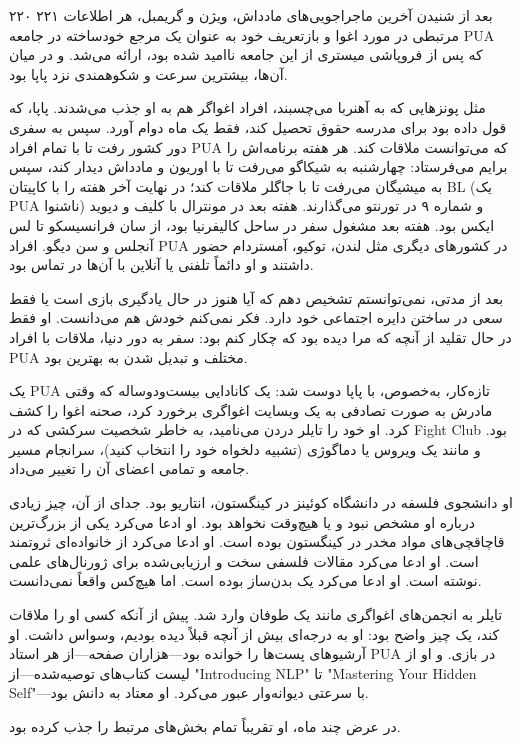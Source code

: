 ۲۲۰  
۲۲۱  
بعد از شنیدن آخرین ماجراجویی‌های مادداش، ویژن و گریمبل، هر اطلاعات مرتبطی در مورد اغوا و بازتعریف خود به عنوان یک مرجع خودساخته در جامعه PUA که پس از فروپاشی میستری از این جامعه ناامید شده بود، ارائه می‌شد. و در میان آن‌ها، بیشترین سرعت و شکوهمندی نزد پاپا بود.  

مثل پونزهایی که به آهنربا می‌چسبند، افراد اغواگر هم به او جذب می‌شدند. پاپا، که قول داده بود برای مدرسه حقوق تحصیل کند، فقط یک ماه دوام آورد. سپس به سفری دور کشور رفت تا با تمام افراد PUA که می‌توانست ملاقات کند. هر هفته برنامه‌اش را برایم می‌فرستاد: چهارشنبه به شیکاگو می‌رفت تا با اوریون و مادداش دیدار کند، سپس به میشیگان می‌رفت تا با جاگلر ملاقات کند؛ در نهایت آخر هفته را با کاپیتان BL (یک PUA ناشنوا) و شماره ۹ در تورنتو می‌گذارند. هفته بعد در مونترال با کلیف و دیوید ایکس بود. هفته بعد مشغول سفر در ساحل کالیفرنیا بود، از سان فرانسیسکو تا لس آنجلس و سن دیگو. افراد PUA در کشورهای دیگری مثل لندن، توکیو، آمستردام حضور داشتند و او دائماً تلفنی یا آنلاین با آن‌ها در تماس بود.  

بعد از مدتی، نمی‌توانستم تشخیص دهم که آیا هنوز در حال یادگیری بازی است یا فقط سعی در ساختن دایره اجتماعی خود دارد. فکر نمی‌کنم خودش هم می‌دانست. او فقط در حال تقلید از آنچه که مرا دیده بود که چکار کنم بود: سفر به دور دنیا، ملاقات با افراد PUA مختلف و تبدیل شدن به بهترین بود.  

یک PUA تازه‌کار، به‌خصوص، با پاپا دوست شد: یک کانادایی بیست‌ودوساله که وقتی مادرش به صورت تصادفی به یک وبسایت اغواگری برخورد کرد، صحنه اغوا را کشف کرد. او خود را تایلر دردن می‌نامید، به خاطر شخصیت سرکشی که در Fight Club بود. و مانند یک ویروس یا دماگوژی (تشبیه دلخواه خود را انتخاب کنید)، سرانجام مسیر جامعه و تمامی اعضای آن را تغییر می‌داد.  

او دانشجوی فلسفه در دانشگاه کوئینز در کینگستون، انتاریو بود. جدای از آن، چیز زیادی درباره او مشخص نبود و یا هیچ‌وقت نخواهد بود. او ادعا می‌کرد یکی از بزرگ‌ترین قاچاقچی‌های مواد مخدر در کینگستون بوده است. او ادعا می‌کرد از خانواده‌ای ثروتمند است. او ادعا می‌کرد مقالات فلسفی سخت و ارزیابی‌شده برای ژورنال‌های علمی نوشته است. او ادعا می‌کرد یک بدن‌ساز بوده است. اما هیچ‌کس واقعاً نمی‌دانست.  

تایلر به انجمن‌های اغواگری مانند یک طوفان وارد شد. پیش از آنکه کسی او را ملاقات کند، یک چیز واضح بود: او به درجه‌ای بیش از آنچه قبلاً دیده بودیم، وسواس داشت. او آرشیوهای پست‌ها را خوانده بود—هزاران صفحه—از هر استاد PUA در بازی. و او از لیست کتاب‌های توصیه‌شده—از "Introducing NLP" تا "Mastering Your Hidden Self"—با سرعتی دیوانه‌وار عبور می‌کرد. او معتاد به دانش بود.  

در عرض چند ماه، او تقریباً تمام بخش‌های مرتبط را جذب کرده بود.